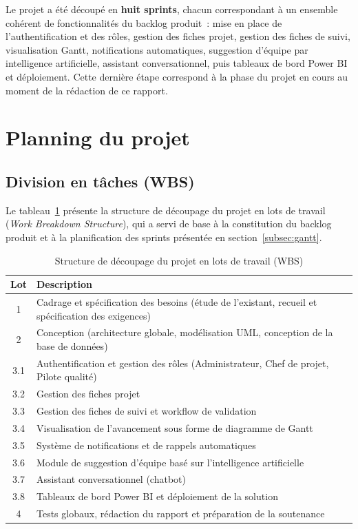 Le projet a été découpé en \textbf{huit sprints}, chacun correspondant à un ensemble cohérent de fonctionnalités du backlog produit~: mise en place de l'authentification et des rôles, gestion des fiches projet, gestion des fiches de suivi, visualisation Gantt, notifications automatiques, suggestion d'équipe par intelligence artificielle, assistant conversationnel, puis tableaux de bord Power BI et déploiement. Cette dernière étape correspond à la phase du projet en cours au moment de la rédaction de ce rapport.

\section{Planning du projet}
\label{sec:planning}

\subsection{Division en tâches (WBS)}
\label{subsec:wbs}

Le tableau~\ref{tab:wbs} présente la structure de découpage du projet en lots de travail (\emph{Work Breakdown Structure}), qui a servi de base à la constitution du backlog produit et à la planification des sprints présentée en section~\ref{subsec:gantt}.

\begin{table}[h!]
\centering
\begin{tabular}{|c|p{10cm}|}
\hline
\textbf{Lot} & \textbf{Description} \\
\hline
1 & Cadrage et spécification des besoins (étude de l'existant, recueil et spécification des exigences) \\
\hline
2 & Conception (architecture globale, modélisation UML, conception de la base de données) \\
\hline
3.1 & Authentification et gestion des rôles (Administrateur, Chef de projet, Pilote qualité) \\
\hline
3.2 & Gestion des fiches projet \\
\hline
3.3 & Gestion des fiches de suivi et workflow de validation \\
\hline
3.4 & Visualisation de l'avancement sous forme de diagramme de Gantt \\
\hline
3.5 & Système de notifications et de rappels automatiques \\
\hline
3.6 & Module de suggestion d'équipe basé sur l'intelligence artificielle \\
\hline
3.7 & Assistant conversationnel (chatbot) \\
\hline
3.8 & Tableaux de bord Power BI et déploiement de la solution \\
\hline
4 & Tests globaux, rédaction du rapport et préparation de la soutenance \\
\hline
\end{tabular}
\caption{Structure de découpage du projet en lots de travail (WBS)}
\label{tab:wbs}
\end{table}

